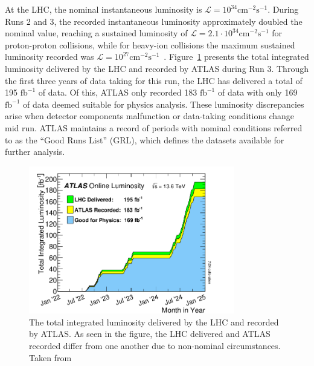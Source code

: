 At the LHC, the nominal instantaneous luminosity is $\mathcal{L} = 10^{34} \mathrm{cm}^{-2}\mathrm{s}^{-1}$. During Runs 2 and 3, the recorded instantaneous luminosity approximately doubled the nominal value, reaching a sustained luminosity of $\mathcal{L} = 2.1 \cdot 10^{34} \mathrm{cm}^{-2}\mathrm{s}^{-1}$ for proton-proton collisions, while for heavy-ion collisions the maximum sustained luminosity recorded was $\mathcal{L} = 10^{27} \mathrm{cm}^{-2}\mathrm{s}^{-1}$~\cite{ATLAS_run3_luminosity_and_detector}. Figure~\ref{fig:atlas_luminosity_recorded} presents the total integrated luminosity delivered by the LHC and recorded by ATLAS during Run 3. Through the first three years of data taking for this run, the LHC has delivered a total of 195 $\mathrm{fb}^{-1}$ of data. Of this, ATLAS only recorded 183 $\mathrm{fb}^{-1}$ of data with only 169 $\mathrm{fb}^{-1}$ of data deemed suitable for physics analysis. These luminosity discrepancies
arise when detector components malfunction or data-taking conditions change mid run. ATLAS maintains a record of periods with nominal conditions referred to as the ``Good Runs List'' (GRL), which defines the datasets available for further analysis.

\begin{figure}
    \centering
    \includegraphics[width=0.8\textwidth]{figures/atlas/atlas_run3_lumi.png}
    \caption{The total integrated luminosity delivered by the LHC and recorded by ATLAS\@. As seen in the figure, the LHC delivered and ATLAS recorded differ from one another due to non-nominal circumstances. Taken from~\cite{atlas_lumi_image}}\label{fig:atlas_luminosity_recorded}
\end{figure}